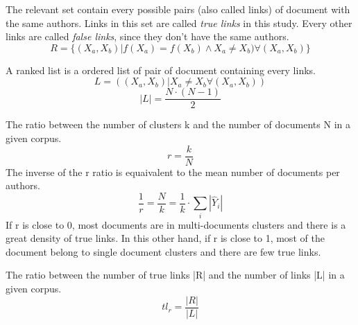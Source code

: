 \begin{definition}
  The relevant set contain every possible pairs (also called links) of document with the same authors. Links in this set are called \textit{true links} in this study. Every other links are called \textit{false links}, since they don't have the same authors.
  \begin{equation}
    R = \{(X_a, X_b) | f(X_a) = f(X_b) \land X_a \neq X_b) \forall (X_a, X_b)\}
  \end{equation}
\end{definition}

\begin{definition}
  A ranked list is a ordered list of pair of document containing every links.
  \begin{equation}
    L = ((X_a, X_b) | X_a \neq X_b \forall (X_a, X_b))
  \end{equation}
  \begin{equation}
    |L| = \frac{N \cdot (N - 1)}{2}
  \end{equation}
\end{definition}

\begin{definition}
  The ratio between the number of clusters k and the number of documents N in a given corpus.
  \begin{equation}
    r = \frac{k}{N}
  \end{equation}
  The inverse of the r ratio is equaivalent to the mean number of documents per authors.
  \begin{equation}
    \frac{1}{r} = \frac{N}{k} = \frac{1}{k} \cdot \sum_{i} |\hat{Y}_i|
  \end{equation}
  If r is close to 0, most documents are in multi-documents clusters and there is a great density of true links.
  In this other hand, if r is close to 1, most of the document belong to single document clusters and there are few true links.
\end{definition}

\begin{definition}
  The ratio between the number of true links |R| and the number of links |L| in a given corpus.
  \begin{equation}
    tl_r = \frac{|R|}{|L|}
  \end{equation}
\end{definition}
